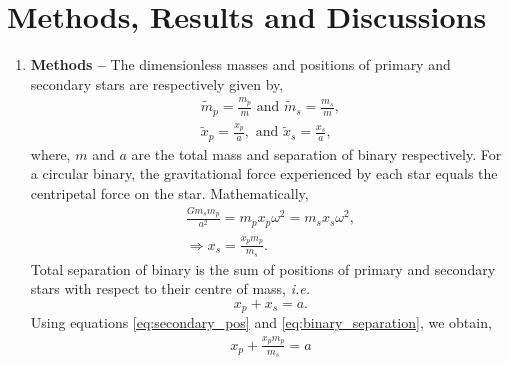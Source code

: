 \documentclass[a4paper]{article}
\begin{document}
		
		\section{Methods, Results and Discussions}
	
		\begin{enumerate} [label*=\textbf{(\alph*)}]
			
			
			\item
				\subitem \textbf{Methods  --}
				The dimensionless masses and positions of primary and secondary stars are respectively given by,
				\begin{equation}
					\begin{gathered}
						\tilde{m}_p^{}=\frac{m_p^{}}{m} \text{ and } \tilde{m}_s^{}=\frac{m_s^{}}{m}, \\
						\tilde{x}_p^{}=\frac{x_p^{}}{a}, \text{ and } \tilde{x}_s^{}=\frac{x_s^{}}{a},
					\end{gathered}
					\label{eq:dimensionless_mass_pos}
				\end{equation}
				where, \(m\) and \(a\) are the total mass and separation of binary respectively. For a circular binary, the gravitational force experienced by each star equals the centripetal force on the star. Mathematically,
				\begin{equation}
					\begin{gathered}
						\frac{Gm_{s}^{}m_{p}^{}}{a^2_{}} = m_p^{} x_p^{} \omega^2_{} = m_s^{} x_s^{} \omega^2_{} , \\
						\Rightarrow x_s^{} = \frac{x_p^{} m_p^{}}{m_s^{}}.
					\end{gathered}
					\label{eq:secondary_pos}
				\end{equation}
				Total separation of binary is the sum of positions of primary and secondary stars with respect to their centre of mass, \textit{i.e.} 
				\begin{equation}
					x_p^{}+x_s^{} = a.
					\label{eq:binary_separation}
				\end{equation}
				Using equations \ref{eq:secondary_pos} and \ref{eq:binary_separation}, we obtain,
				\begin{equation}
					\begin{gathered}
						x_p + \frac{x_p m_p}{m_s} = a \\

\end{gathered}
\end{equation}
\end{enumerate}
\end{document}

